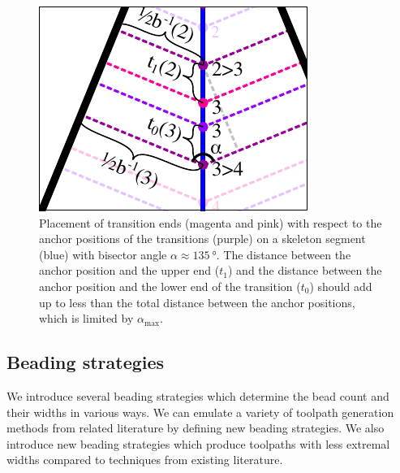 \begin{figure}
\centering
\includegraphics[width=.4\columnwidth]{sources/method/transition_length_limit.pdf}
\caption{
Placement of transition ends (magenta and pink) with respect to the anchor positions of the transitions (purple) on a skeleton segment (blue) with bisector angle $\alpha \approx \SI{135}{\degree}$.
The distance between the anchor position and the upper end ($t_1$) and the distance between the anchor position and the lower end of the transition ($t_0$) should add up to less than the total distance between the anchor positions, which is limited by $\alpha_\text{max}$.
}
\label{transition_placement}
\end{figure}




\subsection{Beading strategies}
We introduce several beading strategies which determine the bead count and their widths in various ways.
We can emulate a variety of toolpath generation methods from related literature by defining new beading strategies.
We also introduce new beading strategies which produce toolpaths with less extremal widths compared to techniques from existing literature.

